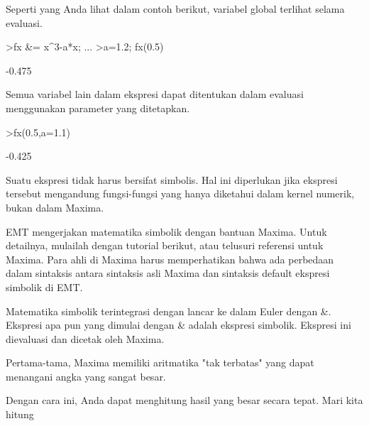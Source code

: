 \documentclass[a4paper,10pt]{article}
\begin{document}
\begin{eulernotebook}
\begin{eulercomment}
Seperti yang Anda lihat dalam contoh berikut, variabel global terlihat
selama evaluasi.
\end{eulercomment}
\begin{eulerprompt}
>fx &= x^3-a*x;  ...
>a=1.2; fx(0.5)
\end{eulerprompt}
\begin{euleroutput}
  -0.475
\end{euleroutput}
\begin{eulercomment}
Semua variabel lain dalam ekspresi dapat ditentukan dalam evaluasi
menggunakan parameter yang ditetapkan.
\end{eulercomment}
\begin{eulerprompt}
>fx(0.5,a=1.1)
\end{eulerprompt}
\begin{euleroutput}
  -0.425
\end{euleroutput}
\begin{eulercomment}
Suatu ekspresi tidak harus bersifat simbolis. Hal ini diperlukan jika
ekspresi tersebut mengandung fungsi-fungsi yang hanya diketahui dalam
kernel numerik, bukan dalam Maxima.

\begin{eulercomment}
\begin{eulercomment}
EMT mengerjakan matematika simbolik dengan bantuan Maxima. Untuk
detailnya, mulailah dengan tutorial berikut, atau telusuri referensi
untuk Maxima. Para ahli di Maxima harus memperhatikan bahwa ada
perbedaan dalam sintaksis antara sintaksis asli Maxima dan  sintaksis
default ekspresi simbolik di EMT.

Matematika simbolik terintegrasi dengan lancar ke dalam Euler dengan
\&. Ekspresi apa pun yang dimulai dengan \& adalah ekspresi simbolik.
Ekspresi ini dievaluasi dan dicetak oleh Maxima.

Pertama-tama, Maxima memiliki aritmatika "tak terbatas" yang dapat
menangani angka yang sangat besar.
\end{eulercomment}
\begin{eulercomment}
Dengan cara ini, Anda dapat menghitung hasil yang besar secara tepat.
Mari kita hitung


\end{eulercomment}
\end{eulercomment}
\end{eulercomment}
\end{eulernotebook}
\end{document}
